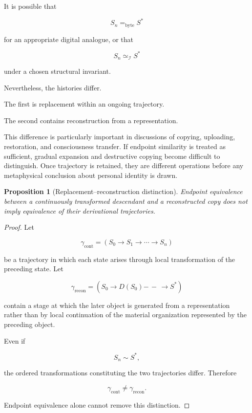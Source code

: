 \documentclass[
  11pt,
  a4paper,
  DIV=12,
  BCOR=0mm,
  parskip=half-
]{scrartcl}
\newcommand{\Inv}{\mathcal I}
\newcommand{\eqbyte}{=_{\mathrm{byte}}}
\newcommand{\simI}{\simeq_{\Inv}}
\newcommand{\dashrightarrow}{\mathrel{{-}\,{-}\,{\to}}}
\theoremstyle{definition}
\theoremstyle{plain}
\newtheorem{proposition}[definition]{Proposition}
\theoremstyle{remark}
\begin{document}
It is possible that

\[
  S_n\eqbyte S^\ast
\]

for an appropriate digital analogue, or that

\[
  S_n\simI S^\ast
\]

under a chosen structural invariant.

Nevertheless, the histories differ.

The first is replacement within an ongoing trajectory.

The second contains reconstruction from a representation.

This difference is particularly important in discussions of copying,
uploading, restoration, and consciousness transfer. If endpoint similarity is
treated as sufficient, gradual expansion and destructive copying become
difficult to distinguish. Once trajectory is retained, they are different
operations before any metaphysical conclusion about personal identity is
drawn.

\begin{proposition}[Replacement--reconstruction distinction]
\label{prop:replacement-reconstruction}
Endpoint equivalence between a continuously transformed descendant and a
reconstructed copy does not imply equivalence of their derivational
trajectories.
\end{proposition}

\begin{proof}
Let

\[
  \gamma_{\mathrm{cont}}
  =
  \left(
  S_0\to S_1\to\cdots\to S_n
  \right)
\]

be a trajectory in which each state arises through local transformation of
the preceding state. Let

\[
  \gamma_{\mathrm{recon}}
  =
  \left(
  S_0\to D(S_0)\dashrightarrow S^\ast
  \right)
\]

contain a stage at which the later object is generated from a representation
rather than by local continuation of the material organization represented by
the preceding object.

Even if

\[
  S_n\sim S^\ast,
\]

the ordered transformations constituting the two trajectories differ.
Therefore

\[
  \gamma_{\mathrm{cont}}
  \neq
  \gamma_{\mathrm{recon}}.
\]

Endpoint equivalence alone cannot remove this distinction.
\end{proof}
\end{document}
